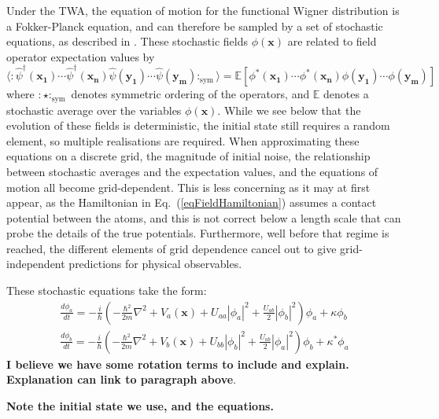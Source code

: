 \documentclass{iopart}
\begin{document}
Under the TWA, the equation of motion for the functional Wigner distribution is a Fokker-Planck equation, and can therefore be sampled by a set of stochastic equations, as described in \cite{GardinerQuantumNoise}.  These stochastic fields $\phi(\mathbf{x})$ are related to field operator expectation values by  
\begin{equation}
\langle :\hat{\psi}^\dagger(\mathbf{x_1})\cdots\hat{\psi}^\dagger(\mathbf{x_n})\hat{\psi}(\mathbf{y_1})\cdots\hat{\psi}(\mathbf{y_m}):_{\mbox{sym}}\rangle = \mathbb{E}\left[\phi^*(\mathbf{x_1})\cdots\phi^*(\mathbf{x_n})\phi(\mathbf{y_1})\cdots\phi(\mathbf{y_m})\right]
\label{eqExpectationRelations}
\end{equation}
%
where $:\star:_{\mbox{sym}}$ denotes symmetric ordering of the operators, and $\mathbb{E}$ denotes a stochastic average over the variables $\phi(\mathbf{x})$.  While we see below that the evolution of these fields is deterministic, the initial state still requires a random element, so multiple realisations are required.  When approximating these equations on a discrete grid, the magnitude of initial noise, the relationship between stochastic averages and the expectation values, and the equations of motion all become grid-dependent.  This is less concerning as it may at first appear, as the Hamiltonian in Eq.~(\ref{eqFieldHamiltonian}) assumes a contact potential between the atoms, and this is not correct below a length scale that can probe the details of the true potentials.  Furthermore, well before that regime is reached, the different elements of grid dependence cancel out to give grid-independent predictions for physical observables.

These stochastic equations take the form:
\begin{eqnarray}
\frac{d \phi_a}{dt} = -\frac{i}{\hbar}\left(-\frac{\hbar^2}{2 m}\nabla^2+V_a(\mathbf{x}) + U_{a a} \left|\phi_{a}\right|^2 + \frac{U_{a b}}{2} \left|\phi_b\right|^2\right)\phi_a   + \kappa \phi_b  \nonumber \\
\frac{d \phi_b}{dt} = -\frac{i}{\hbar}\left(-\frac{\hbar^2}{2 m}\nabla^2+V_b(\mathbf{x}) + U_{b b} \left|\phi_{b}\right|^2 + \frac{U_{a b}}{2} \left|\phi_a\right|^2\right)\phi_b   + \kappa^* \phi_a
  \label{eqStochasticEquations}
\end{eqnarray}
\textbf{I believe we have some rotation terms to include and explain.  Explanation can link to paragraph above}.

\textbf{Note the initial state we use, and the equations.}
\end{document}
